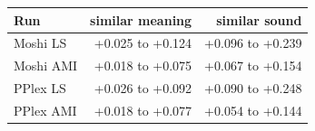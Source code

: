 \begin{tabular}{lrr}
\toprule
Run & similar meaning & similar sound \\
\midrule
Moshi LS & +0.025 to +0.124 & +0.096 to +0.239 \\
Moshi AMI & +0.018 to +0.075 & +0.067 to +0.154 \\
PPlex LS & +0.026 to +0.092 & +0.090 to +0.248 \\
PPlex AMI & +0.018 to +0.077 & +0.054 to +0.144 \\
\bottomrule
\end{tabular}